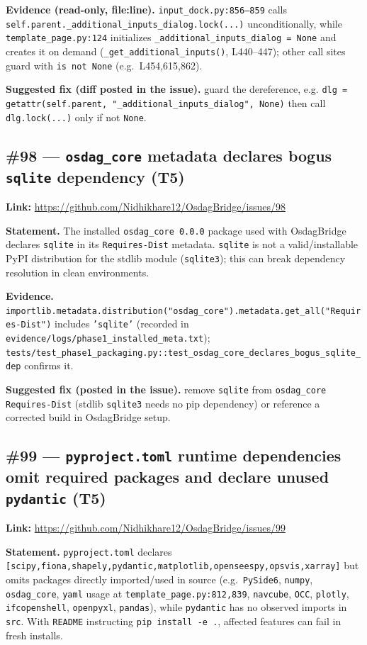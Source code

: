 \textbf{Evidence (read-only, file:line).} \texttt{input\_dock.py:856--859} calls \texttt{self.parent.\_additional\_inputs\_dialog.lock(...)} unconditionally, while \texttt{template\_page.py:124} initializes \texttt{\_additional\_inputs\_dialog = None} and creates it on demand (\texttt{\_get\_additional\_inputs()}, L440--447); other call sites guard with \texttt{is not None} (e.g.\ L454,615,862).

\textbf{Suggested fix (diff posted in the issue).} guard the dereference, e.g. \texttt{dlg = getattr(self.parent, "\_additional\_inputs\_dialog", None)} then call \texttt{dlg.lock(...)} only if not \texttt{None}.

\subsection{\#98 --- \texttt{osdag\_core} metadata declares bogus \texttt{sqlite} dependency (T5)}
\textbf{Link:} \url{https://github.com/Nidhikhare12/OsdagBridge/issues/98}

\textbf{Statement.} The installed \texttt{osdag\_core 0.0.0} package used with OsdagBridge declares \texttt{sqlite} in its \texttt{Requires-Dist} metadata. \texttt{sqlite} is not a valid/installable PyPI distribution for the stdlib module (\texttt{sqlite3}); this can break dependency resolution in clean environments.

\textbf{Evidence.} \texttt{importlib.metadata.distribution("osdag\_core").metadata.get\_all("Requires-Dist")} includes \texttt{'sqlite'} (recorded in \texttt{evidence/logs/phase1\_installed\_meta.txt}); \texttt{tests/test\_phase1\_packaging.py::test\_osdag\_core\_declares\_bogus\_sqlite\_dep} confirms it.

\textbf{Suggested fix (posted in the issue).} remove \texttt{sqlite} from \texttt{osdag\_core} \texttt{Requires-Dist} (stdlib \texttt{sqlite3} needs no pip dependency) or reference a corrected build in OsdagBridge setup.

\subsection{\#99 --- \texttt{pyproject.toml} runtime dependencies omit required packages and declare unused \texttt{pydantic} (T5)}
\textbf{Link:} \url{https://github.com/Nidhikhare12/OsdagBridge/issues/99}

\textbf{Statement.} \texttt{pyproject.toml} declares \texttt{[scipy,fiona,shapely,pydantic,matplotlib,openseespy,opsvis,xarray]} but omits packages directly imported/used in source (e.g.\ \texttt{PySide6}, \texttt{numpy}, \texttt{osdag\_core}, \texttt{yaml} usage at \texttt{template\_page.py:812,839}, \texttt{navcube}, \texttt{OCC}, \texttt{plotly}, \texttt{ifcopenshell}, \texttt{openpyxl}, \texttt{pandas}), while \texttt{pydantic} has no observed imports in \texttt{src}. With \texttt{README} instructing \texttt{pip install -e .}, affected features can fail in fresh installs.

